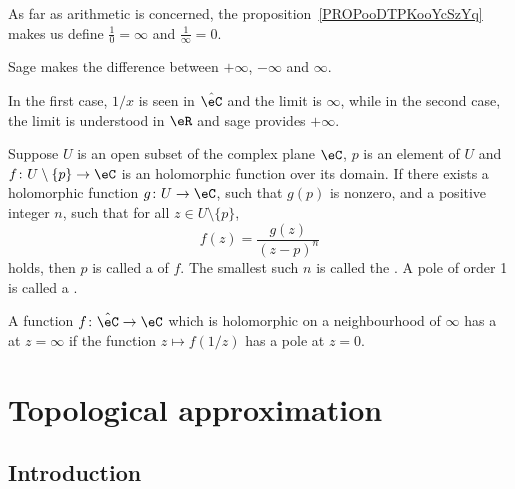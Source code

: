 As far as arithmetic is concerned, the proposition~\ref{PROPooDTPKooYcSzYq} makes us  define \( \frac{1}{ 0 }=\infty\) and \( \frac{ 1 }{ \infty }=0\).

\begin{remark}
    
    Sage makes the difference between \( +\infty\), \( -\infty\) and \( \infty\).

    In the first case, \( 1/x\) is seen in \( \hat \eC\) and the limit is \( \infty\), while in the second case, the limit is understood in \( \eR\) and sage provides \( +\infty\).
\end{remark}

\begin{definition}       \label{DEFooPXYYooOMZYOT}
    Suppose \( U\) is an open subset of the complex plane \( \eC\), $p$ is an element of $U$ and \( f\colon U\setminus\{ p \}\to \eC\) is an holomorphic function  over its domain. If there exists a holomorphic function \( g\colon U\to \eC\), such that $g(p)$ is nonzero, and a positive integer $n$, such that for all \( z\in U\setminus\{ p \}\),
    \begin{equation}
        f(z)=\frac{ g(z) }{ (z-p)^n }
    \end{equation}
    holds, then $p$ is called a  of \( f\). The smallest such $n$ is called the . A pole of order 1 is called a .

    A function \( f\colon \hat \eC\to \eC\) which is holomorphic on a neighbourhood of \( \infty\) has a  at \( z=\infty\) if the function \( z\mapsto f(1/z)\) has a pole at \( z=0\).
\end{definition}

\section{Topological approximation}
\subsection{Introduction}


